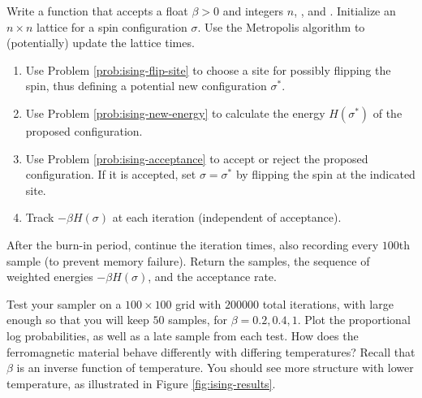 \begin{problem}
Write a function that accepts a float $\beta>0$ and integers $n$, , and .
Initialize an $n\times n$ lattice for a spin configuration $\sigma$.
Use the Metropolis algorithm to (potentially) update the lattice  times.
\begin{enumerate}
    \item Use Problem \ref{prob:ising-flip-site} to choose a site for possibly flipping the spin, thus defining a potential new configuration $\sigma^*$.
    \item Use Problem \ref{prob:ising-new-energy} to calculate the energy $H(\sigma^*)$ of the proposed configuration.
    \item Use Problem \ref{prob:ising-acceptance} to accept or reject the proposed configuration.
    If it is accepted, set $\sigma = \sigma^*$ by flipping the spin at the indicated site.
    \item Track $-\beta H(\sigma)$ at each iteration (independent of acceptance).
\end{enumerate}
After the burn-in period, continue the iteration  times, also recording every $100$th sample (to prevent memory failure).
Return the samples, the sequence of weighted energies $-\beta H(\sigma)$, and the acceptance rate.

Test your sampler on a $100 \times 100$ grid with $200000$ total iterations, with  large enough so that you will keep $50$ samples, for $\beta = 0.2, 0.4, 1$.
Plot the proportional log probabilities, as well as a late sample from each test.
How does the ferromagnetic material behave differently with differing temperatures?
Recall that $\beta$ is an inverse function of temperature.
You should see more structure with lower temperature, as illustrated in Figure \ref{fig:ising-results}.
\end{problem}


